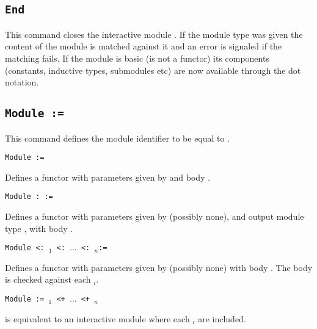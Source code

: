 \subsection{\tt End {\ident}
}

This command closes the interactive module {\ident}. If the module type
was given the content of the module is matched against it and an error
is signaled if the matching fails. If the module is basic (is not a
functor) its components (constants, inductive types, submodules etc) are
now available through the dot notation.

\begin{ErrMsgs}
\item {}
\item {}
\item {}
\end{ErrMsgs}


\subsection{\tt Module {\ident} := {\modexpr}
}

This command defines the module identifier {\ident} to be equal to
{\modexpr}. 

\begin{Variants}
\item{\tt Module {\ident} {\modbindings} := {\modexpr}}

 Defines a functor with parameters given by {\modbindings} and body {\modexpr}.

%
%

\item{\tt Module {\ident} {\modbindings} \verb.:. {\modtype} :=
    {\modexpr}}

  Defines a functor with parameters given by {\modbindings} (possibly none),
  and output module type {\modtype}, with body {\modexpr}. 

\item{\tt Module {\ident} {\modbindings} \verb.<:.  {\modtype$_1$} \verb.<:. $\ldots$ \verb.<:. {\modtype$_n$}:=
    {\modexpr}}

  Defines a functor with parameters given by {\modbindings} (possibly none) 
  with body {\modexpr}. The body is checked against each {\modtype$_i$}.

\item{\tt Module {\ident} {\modbindings} := {\modexpr$_1$} \verb.<+. $\ldots$ \verb.<+. {\modexpr$_n$}}

  is equivalent to an interactive module where each {\modexpr$_i$} are included.

\end{Variants}

